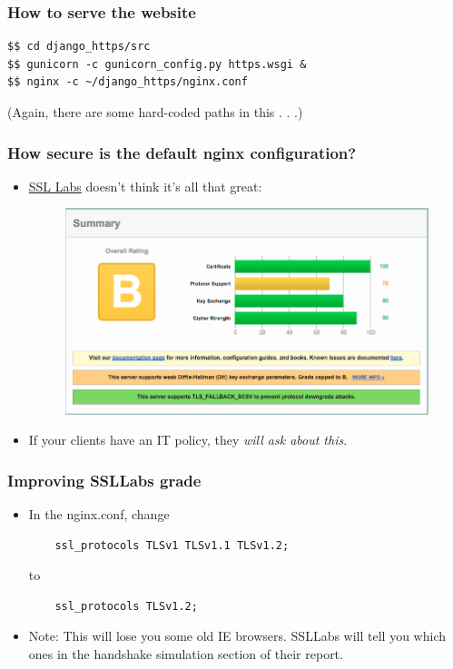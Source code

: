 \documentclass[9pt]{beamer}
\begin{document}
\begin{frame}[fragile]
\frametitle{How to serve the website}
\begin{verbatim}
$$ cd django_https/src
$$ gunicorn -c gunicorn_config.py https.wsgi &
$$ nginx -c ~/django_https/nginx.conf
\end{verbatim}
(Again, there are some hard-coded paths in this . . .)
\end{frame}

\begin{frame}[fragile]
\frametitle{How secure is the default nginx configuration?}
\begin{itemize}
\item \href{https://www.ssllabs.com/ssltest/analyze.html}{SSL Labs} doesn't think it's all that great:

\begin{figure}
\includegraphics[scale=0.25]{figures/SSLLabsFirstGrade.png}
\end{figure}
\pause
\item If your clients have an IT policy, they \emph{will ask about this}.
\end{itemize}
\end{frame}

\begin{frame}[fragile]
\frametitle{Improving SSLLabs grade}
\begin{itemize}
\item In the nginx.conf, change 
\begin{verbatim}
    ssl_protocols TLSv1 TLSv1.1 TLSv1.2;
\end{verbatim}
to
\begin{verbatim}
    ssl_protocols TLSv1.2;
\end{verbatim}
\pause
\item Note: This will lose you some old IE browsers. SSLLabs will tell you which ones in the handshake simulation section of their report.
\end{itemize}
\end{frame}
\end{document}
